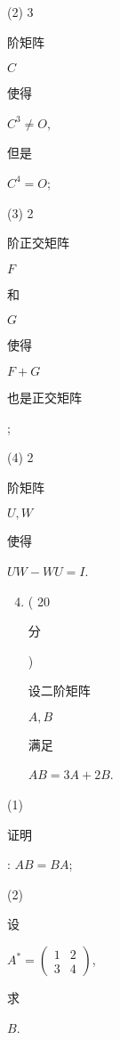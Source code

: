 \documentclass[10pt]{article}
\begin{document}
(2) 3 \begin{CJK}{UTF8}{mj}阶矩阵\end{CJK} $C$ \begin{CJK}{UTF8}{mj}使得\end{CJK} $C^{3} \neq O$, \begin{CJK}{UTF8}{mj}但是\end{CJK} $C^{4}=O$;

(3) 2 \begin{CJK}{UTF8}{mj}阶正交矩阵\end{CJK} $F$ \begin{CJK}{UTF8}{mj}和\end{CJK} $G$ \begin{CJK}{UTF8}{mj}使得\end{CJK} $F+G$ \begin{CJK}{UTF8}{mj}也是正交矩阵\end{CJK};

(4) 2 \begin{CJK}{UTF8}{mj}阶矩阵\end{CJK} $U, W$ \begin{CJK}{UTF8}{mj}使得\end{CJK} $U W-W U=I$.

\begin{enumerate}
  \setcounter{enumi}{3}
  \item ( 20 \begin{CJK}{UTF8}{mj}分\end{CJK}) \begin{CJK}{UTF8}{mj}设二阶矩阵\end{CJK} $A, B$ \begin{CJK}{UTF8}{mj}满足\end{CJK} $A B=3 A+2 B$.
\end{enumerate}
(1) \begin{CJK}{UTF8}{mj}证明\end{CJK}: $A B=B A$;

(2) \begin{CJK}{UTF8}{mj}设\end{CJK} $A^{*}=\left(\begin{array}{ll}1 & 2 \\ 3 & 4\end{array}\right)$, \begin{CJK}{UTF8}{mj}求\end{CJK} $B$.
\end{document}
